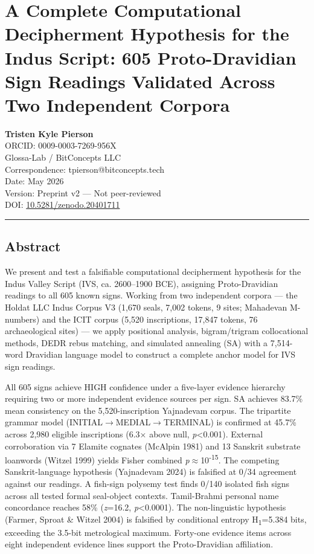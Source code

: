 \documentclass[
  11pt,
]{article}
\author{}
\date{}
\begin{document}
\section{A Complete Computational Decipherment Hypothesis for the Indus
Script: 605 Proto-Dravidian Sign Readings Validated Across Two
Independent
Corpora}\label{a-complete-computational-decipherment-hypothesis-for-the-indus-script-605-proto-dravidian-sign-readings-validated-across-two-independent-corpora}

\textbf{Tristen Kyle Pierson}\\
ORCID: 0009-0003-7269-956X\\
Glossa-Lab / BitConcepts LLC\\
Correspondence: tpierson@bitconcepts.tech\\
Date: May 2026\\
Version: Preprint v2 --- Not peer-reviewed\\
DOI: \href{https://zenodo.org/records/20401711}{10.5281/zenodo.20401711}

\begin{center}\rule{0.5\linewidth}{0.5pt}\end{center}

\subsection{Abstract}\label{abstract}

We present and test a falsifiable computational decipherment hypothesis
for the Indus Valley Script (IVS, ca. 2600--1900 BCE), assigning
Proto-Dravidian readings to all 605 known signs. Working from two
independent corpora --- the Holdat LLC Indus Corpus V3 (1,670 seals,
7,002 tokens, 9 sites; Mahadevan M-numbers) and the ICIT corpus
(5,520 inscriptions, 17,847 tokens, 76 archaeological sites) --- we
apply positional analysis, bigram/trigram collocational methods, DEDR
rebus matching, and simulated annealing (SA) with a 7,514-word Dravidian
language model to construct a complete anchor model for IVS sign
readings.

All 605 signs achieve HIGH confidence under a five-layer evidence
hierarchy requiring two or more independent evidence sources per sign.
SA achieves 83.7\% mean consistency on the 5,520-inscription Yajnadevam
corpus. The tripartite grammar model (INITIAL$\to$MEDIAL$\to$TERMINAL) is
confirmed at 45.7\% across 2,980 eligible inscriptions (6.3× above null,
\emph{p}\textless0.001). External corroboration via 7 Elamite cognates
(McAlpin 1981) and 13 Sanskrit substrate loanwords (Witzel 1999) yields
Fisher combined \emph{p}$\approx$10\textsuperscript{-15}. The competing
Sanskrit-language hypothesis (Yajnadevam 2024) is falsified at 0/34
agreement against our readings. A fish-sign polysemy test finds 0/140
isolated fish signs across all tested formal seal-object contexts. Tamil-Brahmi
personal name concordance reaches 58\% (\emph{z}=16.2,
\emph{p}\textless0.0001). The non-linguistic hypothesis (Farmer, Sproat
\& Witzel 2004) is falsified by conditional entropy
H\textsubscript{1}=5.384 bits, exceeding the 3.5-bit metrological
maximum. Forty-one evidence items across eight independent evidence
lines support the Proto-Dravidian affiliation.
\end{document}
